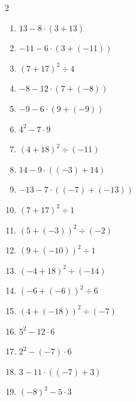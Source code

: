 \documentclass[11pt]{article}
\begin{document}
\begin{multicols}{2}
\begin{enumerate}
  \vspace{1.1cm}
  \item $13 - 8 \cdot (3 + 13)$
  \vspace{1.1cm}
  \item $-11 - 6 \cdot (3 + (-11))$
  \vspace{1.1cm}
  \item $(7 + 17)^{2} \div 4$
  \vspace{1.1cm}
  \item $-8 - 12 \cdot (7 + (-8))$
  \vspace{1.1cm}
  \item $-9 - 6 \cdot (9 + (-9))$
  \vspace{1.1cm}
  \item $4^{2} - 7 \cdot 9$
  \vspace{1.1cm}
  \item $(4 + 18)^{2} \div (-11)$
  \vspace{1.1cm}
  \item $14 - 9 \cdot ((-3) + 14)$
  \vspace{1.1cm}
  \item $-13 - 7 \cdot ((-7) + (-13))$
  \vspace{1.1cm}
  \item $(7 + 17)^{2} \div 1$
  \vspace{1.1cm}
  \item $(5 + (-3))^{2} \div (-2)$
  \vspace{1.1cm}
  \item $(9 + (-10))^{2} \div 1$
  \vspace{1.1cm}
  \item $(-4 + 18)^{2} \div (-14)$
  \vspace{1.1cm}
  \item $(-6 + (-6))^{2} \div 6$
  \vspace{1.1cm}
  \item $(4 + (-18))^{2} \div (-7)$
  \vspace{1.1cm}
  \item $5^{2} - 12 \cdot 6$
  \vspace{1.1cm}
  \item $2^{2} - (-7) \cdot 6$
  \vspace{1.1cm}
  \item $3 - 11 \cdot ((-7) + 3)$
  \vspace{1.1cm}
  \item $(-8)^{2} - 5 \cdot 3$
  \vspace{1.1cm}
\end{enumerate}
\end{multicols}
\end{document}

